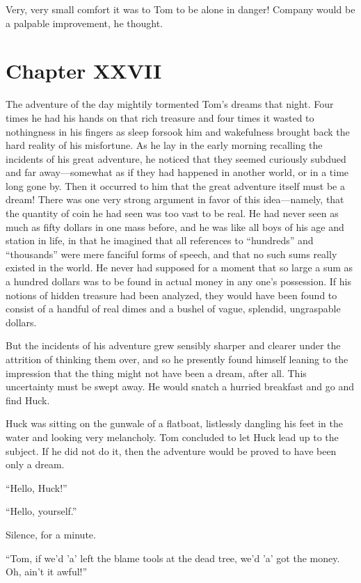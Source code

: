 \documentclass{book}
\begin{document}
Very, very small comfort it was to Tom to be alone in danger! Company would be a palpable improvement, he thought.

\chapter*{Chapter XXVII}

The adventure of the day mightily tormented Tom’s dreams that night. Four times he had his hands on that rich treasure and four times it wasted to nothingness in his fingers as sleep forsook him and wakefulness brought back the hard reality of his misfortune. As he lay in the early morning recalling the incidents of his great adventure, he noticed that they seemed curiously subdued and far away—somewhat as if they had happened in another world, or in a time long gone by. Then it occurred to him that the great adventure itself must be a dream! There was one very strong argument in favor of this idea—namely, that the quantity of coin he had seen was too vast to be real. He had never seen as much as fifty dollars in one mass before, and he was like all boys of his age and station in life, in that he imagined that all references to “hundreds” and “thousands” were mere fanciful forms of speech, and that no such sums really existed in the world. He never had supposed for a moment that so large a sum as a hundred dollars was to be found in actual money in any one’s possession. If his notions of hidden treasure had been analyzed, they would have been found to consist of a handful of real dimes and a bushel of vague, splendid, ungraspable dollars.

But the incidents of his adventure grew sensibly sharper and clearer under the attrition of thinking them over, and so he presently found himself leaning to the impression that the thing might not have been a dream, after all. This uncertainty must be swept away. He would snatch a hurried breakfast and go and find Huck.

Huck was sitting on the gunwale of a flatboat, listlessly dangling his feet in the water and looking very melancholy. Tom concluded to let Huck lead up to the subject. If he did not do it, then the adventure would be proved to have been only a dream.

“Hello, Huck!”

“Hello, yourself.”

Silence, for a minute.

“Tom, if we’d ’a’ left the blame tools at the dead tree, we’d ’a’ got the money. Oh, ain’t it awful!”
\end{document}
